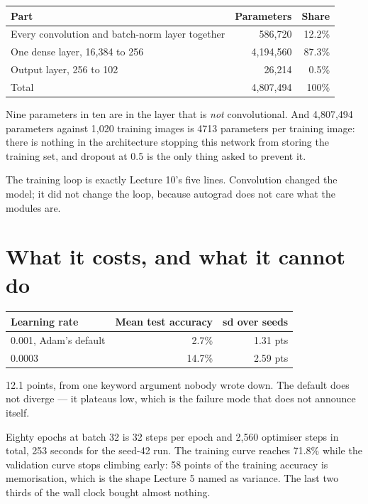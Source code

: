 \documentclass[11pt,a4paper]{article}
\begin{document}
\begin{center}
\small
\begin{tabular}{lrr}
\toprule
\textbf{Part} & \textbf{Parameters} & \textbf{Share} \\
\midrule
Every convolution and batch-norm layer together & 586{,}720 & 12.2\% \\
One dense layer, 16{,}384 to 256 & 4{,}194{,}560 & 87.3\% \\
Output layer, 256 to 102 & 26{,}214 & 0.5\% \\
\midrule
Total & 4{,}807{,}494 & 100\% \\
\bottomrule
\end{tabular}
\end{center}

Nine parameters in ten are in the layer that is \emph{not} convolutional. And
4{,}807{,}494 parameters against 1{,}020 training images is 4713 parameters per
training image: there is nothing in the architecture stopping this network from
storing the training set, and dropout at 0.5 is the only thing asked to prevent
it.

The training loop is exactly Lecture 10's five lines. Convolution changed the
model; it did not change the loop, because autograd does not care what the
modules are.

\section{What it costs, and what it cannot do}

\begin{center}
\small
\begin{tabular}{lrr}
\toprule
\textbf{Learning rate} & \textbf{Mean test accuracy} & \textbf{sd over seeds} \\
\midrule
0.001, Adam's default & 2.7\% & 1.31 pts \\
0.0003 & 14.7\% & 2.59 pts \\
\bottomrule
\end{tabular}
\end{center}

12.1 points, from one keyword argument nobody wrote down. The default does not
diverge --- it plateaus low, which is the failure mode that does not announce
itself.

Eighty epochs at batch 32 is 32 steps per epoch and 2{,}560 optimiser steps in
total, 253 seconds for the seed-42 run. The training curve reaches 71.8\% while
the validation curve stops climbing early: 58 points of the training accuracy
is memorisation, which is the shape Lecture 5 named as variance. The last two
thirds of the wall clock bought almost nothing.
\end{document}
